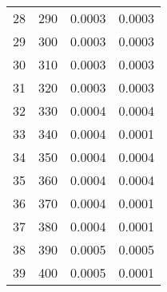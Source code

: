 \begin{table}
\begin{adjustbox}{width=1\textwidth/2}
\begin{tabular}{|c|c|c|c|}
\cline{1-4}
28 & 290 & 0.0003 & 0.0003 \\
\cline{1-4}
29 & 300 & 0.0003 & 0.0003 \\
\cline{1-4}
30 & 310 & 0.0003 & 0.0003 \\
\cline{1-4}
31 & 320 & 0.0003 & 0.0003 \\
\cline{1-4}
32 & 330 & 0.0004 & 0.0004 \\
\cline{1-4}
33 & 340 & 0.0004 & 0.0001 \\
\cline{1-4}
34 & 350 & 0.0004 & 0.0004 \\
\cline{1-4}
35 & 360 & 0.0004 & 0.0004 \\
\cline{1-4}
36 & 370 & 0.0004 & 0.0001 \\
\cline{1-4}
37 & 380 & 0.0004 & 0.0001 \\
\cline{1-4}
38 & 390 & 0.0005 & 0.0005 \\
\cline{1-4}
39 & 400 & 0.0005 & 0.0001 \\
\cline{1-4}
\end{tabular}
\end{adjustbox}
\end{table}

